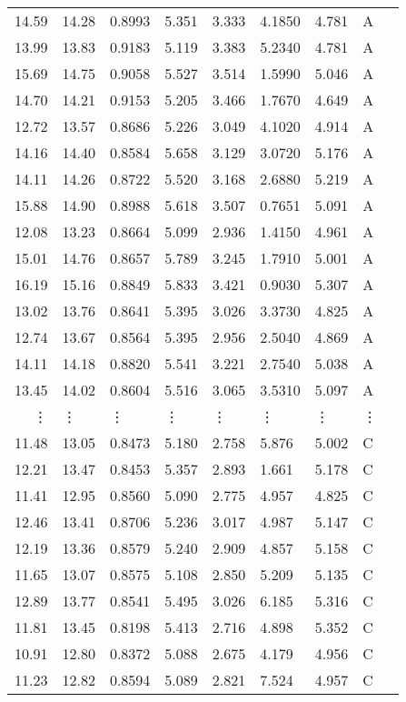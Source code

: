 \documentclass[11pt]{article}
\begin{document}
\begin{tabular}{r|llllllll}
	 14.59 & 14.28 & 0.8993 & 5.351 & 3.333 & 4.1850 & 4.781 & A\\
	 13.99 & 13.83 & 0.9183 & 5.119 & 3.383 & 5.2340 & 4.781 & A\\
	 15.69 & 14.75 & 0.9058 & 5.527 & 3.514 & 1.5990 & 5.046 & A\\
	 14.70 & 14.21 & 0.9153 & 5.205 & 3.466 & 1.7670 & 4.649 & A\\
	 12.72 & 13.57 & 0.8686 & 5.226 & 3.049 & 4.1020 & 4.914 & A\\
	 14.16 & 14.40 & 0.8584 & 5.658 & 3.129 & 3.0720 & 5.176 & A\\
	 14.11 & 14.26 & 0.8722 & 5.520 & 3.168 & 2.6880 & 5.219 & A\\
	 15.88 & 14.90 & 0.8988 & 5.618 & 3.507 & 0.7651 & 5.091 & A\\
	 12.08 & 13.23 & 0.8664 & 5.099 & 2.936 & 1.4150 & 4.961 & A\\
	 15.01 & 14.76 & 0.8657 & 5.789 & 3.245 & 1.7910 & 5.001 & A\\
	 16.19 & 15.16 & 0.8849 & 5.833 & 3.421 & 0.9030 & 5.307 & A\\
	 13.02 & 13.76 & 0.8641 & 5.395 & 3.026 & 3.3730 & 4.825 & A\\
	 12.74 & 13.67 & 0.8564 & 5.395 & 2.956 & 2.5040 & 4.869 & A\\
	 14.11 & 14.18 & 0.8820 & 5.541 & 3.221 & 2.7540 & 5.038 & A\\
	 13.45 & 14.02 & 0.8604 & 5.516 & 3.065 & 3.5310 & 5.097 & A\\
	 ⋮ & ⋮ & ⋮ & ⋮ & ⋮ & ⋮ & ⋮ & ⋮\\
	 11.48 & 13.05 & 0.8473 & 5.180 & 2.758 & 5.876 & 5.002 & C\\
	 12.21 & 13.47 & 0.8453 & 5.357 & 2.893 & 1.661 & 5.178 & C\\
	 11.41 & 12.95 & 0.8560 & 5.090 & 2.775 & 4.957 & 4.825 & C\\
	 12.46 & 13.41 & 0.8706 & 5.236 & 3.017 & 4.987 & 5.147 & C\\
	 12.19 & 13.36 & 0.8579 & 5.240 & 2.909 & 4.857 & 5.158 & C\\
	 11.65 & 13.07 & 0.8575 & 5.108 & 2.850 & 5.209 & 5.135 & C\\
	 12.89 & 13.77 & 0.8541 & 5.495 & 3.026 & 6.185 & 5.316 & C\\
	 11.81 & 13.45 & 0.8198 & 5.413 & 2.716 & 4.898 & 5.352 & C\\
	 10.91 & 12.80 & 0.8372 & 5.088 & 2.675 & 4.179 & 4.956 & C\\
	 11.23 & 12.82 & 0.8594 & 5.089 & 2.821 & 7.524 & 4.957 & C\\

\end{tabular}
\end{document}
